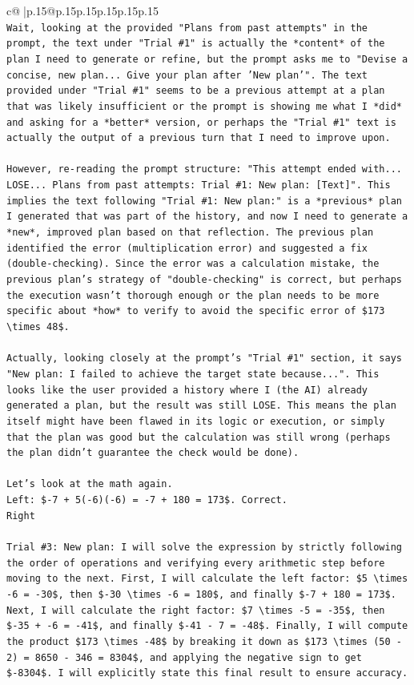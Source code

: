 \documentclass{article}
\begin{document}
{\begin{supertabular}{c@{$\;$}|p{.15\linewidth}@{}p{.15\linewidth}p{.15\linewidth}p{.15\linewidth}p{.15\linewidth}p{.15\linewidth}}
{{{\\ 
\texttt{Wait, looking at the provided "Plans from past attempts" in the prompt, the text under "Trial \#1" is actually the *content* of the plan I need to generate or refine, but the prompt asks me to "Devise a concise, new plan... Give your plan after 'New plan'". The text provided under "Trial \#1" seems to be a previous attempt at a plan that was likely insufficient or the prompt is showing me what I *did* and asking for a *better* version, or perhaps the "Trial \#1" text is actually the output of a previous turn that I need to improve upon.} \\
\\ 
\texttt{However, re{-}reading the prompt structure: "This attempt ended with... LOSE... Plans from past attempts: Trial \#1: New plan: {[}Text{]}". This implies the text following "Trial \#1: New plan:" is a *previous* plan I generated that was part of the history, and now I need to generate a *new*, improved plan based on that reflection. The previous plan identified the error (multiplication error) and suggested a fix (double{-}checking). Since the error was a calculation mistake, the previous plan's strategy of "double{-}checking" is correct, but perhaps the execution wasn't thorough enough or the plan needs to be more specific about *how* to verify to avoid the specific error of \$173 \textbackslash{}times 48\$.} \\
\\ 
\texttt{Actually, looking closely at the prompt's "Trial \#1" section, it says "New plan: I failed to achieve the target state because...". This looks like the user provided a history where I (the AI) already generated a plan, but the result was still LOSE. This means the plan itself might have been flawed in its logic or execution, or simply that the plan was good but the calculation was still wrong (perhaps the plan didn't guarantee the check would be done).} \\
\\ 
\texttt{Let's look at the math again.} \\
\texttt{Left: \${-}7 + 5({-}6)({-}6) = {-}7 + 180 = 173\$. Correct.} \\
\texttt{Right} \\
\\ 
\texttt{Trial \#3: New plan: I will solve the expression by strictly following the order of operations and verifying every arithmetic step before moving to the next. First, I will calculate the left factor: \$5 \textbackslash{}times {-}6 = {-}30\$, then \${-}30 \textbackslash{}times {-}6 = 180\$, and finally \${-}7 + 180 = 173\$. Next, I will calculate the right factor: \$7 \textbackslash{}times {-}5 = {-}35\$, then \${-}35 + {-}6 = {-}41\$, and finally \${-}41 {-} 7 = {-}48\$. Finally, I will compute the product \$173 \textbackslash{}times {-}48\$ by breaking it down as \$173 \textbackslash{}times (50 {-} 2) = 8650 {-} 346 = 8304\$, and applying the negative sign to get \${-}8304\$. I will explicitly state this final result to ensure accuracy.} \\
}}}
\end{supertabular}}
\end{document}
